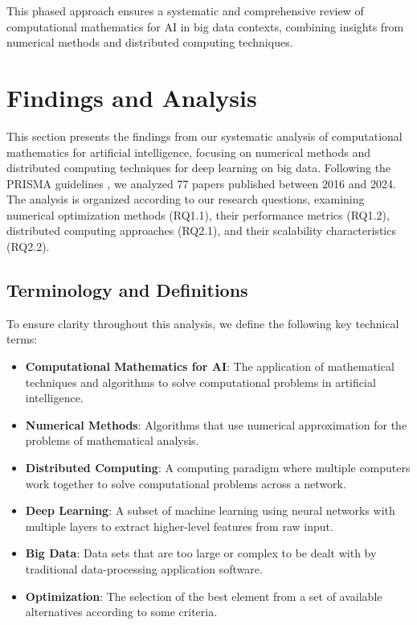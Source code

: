 \documentclass[12pt]{acm/acmart}
\begin{document}
This phased approach ensures a systematic and comprehensive review of computational mathematics for AI in big data contexts, combining insights from numerical methods and distributed computing techniques.

\section{Findings and Analysis}\label{sec:findings-and-analysis}
This section presents the findings from our systematic analysis of computational mathematics for artificial intelligence, focusing on numerical methods and distributed computing techniques for deep learning on big data. Following the PRISMA guidelines \citep{moher2009preferred}, we analyzed 77 papers published between 2016 and 2024. The analysis is organized according to our research questions, examining numerical optimization methods (RQ1.1), their performance metrics (RQ1.2), distributed computing approaches (RQ2.1), and their scalability characteristics (RQ2.2).

\subsection{Terminology and Definitions}\label{subsec:terminology-and-definitions}
To ensure clarity throughout this analysis, we define the following key technical terms:
\begin{itemize}
    \item \textbf{Computational Mathematics for AI}: The application of mathematical techniques and algorithms to solve computational problems in artificial intelligence.
    \item \textbf{Numerical Methods}: Algorithms that use numerical approximation for the problems of mathematical analysis.
    \item \textbf{Distributed Computing}: A computing paradigm where multiple computers work together to solve computational problems across a network.
    \item \textbf{Deep Learning}: A subset of machine learning using neural networks with multiple layers to extract higher-level features from raw input.
    \item \textbf{Big Data}: Data sets that are too large or complex to be dealt with by traditional data-processing application software.
    \item \textbf{Optimization}: The selection of the best element from a set of available alternatives according to some criteria.
\end{itemize}
\end{document}
